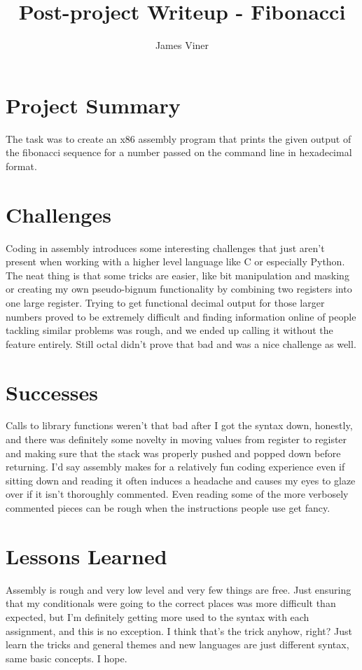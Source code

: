 \documentclass[11pt]{report}
\begin{document}
\title{Post-project Writeup - Fibonacci}
\author{James Viner}
\date{} %

\maketitle

\doublespacing

\section*{Project Summary}
The task was to create an x86 assembly program that prints the given output of the fibonacci sequence for a number passed on the command line in hexadecimal format.
\section*{Challenges}
Coding in assembly introduces some interesting challenges that just aren't present when working with a higher level language like C or especially Python. The neat thing is that some tricks are easier, like bit manipulation and masking or creating my own pseudo-bignum functionality by combining two registers into one large register. Trying to get functional decimal output for those larger numbers proved to be extremely difficult and finding information online of people tackling similar problems was rough, and we ended up calling it without the feature entirely. Still octal didn't prove that bad and was a nice challenge as well.
\pagebreak
\section*{Successes}
Calls to library functions weren't that bad after I got the syntax down, honestly, and there was definitely some novelty in moving values from register to register and making sure that the stack was properly pushed and popped down before returning. I'd say assembly makes for a relatively fun coding experience even if sitting down and reading it often induces a headache and causes my eyes to glaze over if it isn't thoroughly commented. Even reading some of the more verbosely commented pieces can be rough when the instructions people use get fancy.
\section*{Lessons Learned}
Assembly is rough and very low level and very few things are free. Just ensuring that my conditionals were going to the correct places was more difficult than expected, but I'm definitely getting more used to the syntax with each assignment, and this is no exception. I think that's the trick anyhow, right? Just learn the tricks and general themes and new languages are just different syntax, same basic concepts. I hope.
\end{document}
